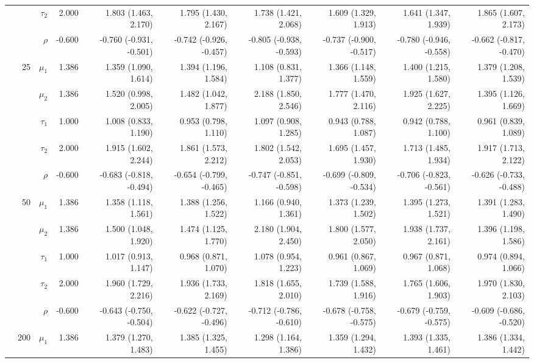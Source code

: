 \documentclass[
]{article}
\begin{document}
\begin{table}
\begin{tabular}[t]{rrrrrrrrrr}
 &  & $\tau_2$ & 2.000 & 1.803 (1.463, 2.170) & 1.795 (1.430, 2.167) & 1.738 (1.421, 2.068) & 1.609 (1.329, 1.913) & 1.641 (1.347, 1.939) & 1.865 (1.607, 2.173)\\
 &  & $\rho$ & -0.600 & -0.760 (-0.931, -0.501) & -0.742 (-0.926, -0.457) & -0.805 (-0.938, -0.593) & -0.737 (-0.900, -0.517) & -0.780 (-0.946, -0.558) & -0.662 (-0.817, -0.470)\\
\addlinespace
 & 25 & $\mu_1$ & 1.386 & 1.359 (1.090, 1.614) & 1.394 (1.196, 1.584) & 1.108 (0.831, 1.377) & 1.366 (1.148, 1.559) & 1.400 (1.215, 1.580) & 1.379 (1.208, 1.539)\\
 &  & $\mu_2$ & 1.386 & 1.520 (0.998, 2.005) & 1.482 (1.042, 1.877) & 2.188 (1.850, 2.546) & 1.777 (1.470, 2.116) & 1.925 (1.627, 2.225) & 1.395 (1.126, 1.669)\\
 &  & $\tau_1$ & 1.000 & 1.008 (0.833, 1.190) & 0.953 (0.798, 1.110) & 1.097 (0.908, 1.285) & 0.943 (0.788, 1.087) & 0.942 (0.788, 1.100) & 0.961 (0.839, 1.089)\\
 &  & $\tau_2$ & 2.000 & 1.915 (1.602, 2.244) & 1.861 (1.573, 2.212) & 1.802 (1.542, 2.053) & 1.695 (1.457, 1.930) & 1.713 (1.485, 1.934) & 1.917 (1.713, 2.122)\\
 &  & $\rho$ & -0.600 & -0.683 (-0.818, -0.494) & -0.654 (-0.799, -0.465) & -0.747 (-0.851, -0.598) & -0.699 (-0.809, -0.534) & -0.706 (-0.823, -0.561) & -0.626 (-0.733, -0.488)\\
\addlinespace
 & 50 & $\mu_1$ & 1.386 & 1.358 (1.118, 1.561) & 1.388 (1.256, 1.522) & 1.166 (0.940, 1.361) & 1.373 (1.239, 1.502) & 1.395 (1.273, 1.521) & 1.391 (1.283, 1.490)\\
 &  & $\mu_2$ & 1.386 & 1.500 (1.048, 1.920) & 1.474 (1.125, 1.770) & 2.180 (1.904, 2.450) & 1.800 (1.577, 2.050) & 1.938 (1.737, 2.161) & 1.396 (1.198, 1.586)\\
 &  & $\tau_1$ & 1.000 & 1.017 (0.913, 1.147) & 0.968 (0.871, 1.070) & 1.078 (0.954, 1.223) & 0.961 (0.867, 1.069) & 0.967 (0.871, 1.068) & 0.974 (0.894, 1.066)\\
 &  & $\tau_2$ & 2.000 & 1.960 (1.729, 2.216) & 1.936 (1.733, 2.169) & 1.818 (1.655, 2.010) & 1.739 (1.588, 1.916) & 1.765 (1.606, 1.903) & 1.970 (1.830, 2.103)\\
 &  & $\rho$ & -0.600 & -0.643 (-0.750, -0.504) & -0.622 (-0.727, -0.496) & -0.712 (-0.786, -0.610) & -0.678 (-0.758, -0.575) & -0.679 (-0.759, -0.575) & -0.609 (-0.686, -0.520)\\
\addlinespace
 & 200 & $\mu_1$ & 1.386 & 1.379 (1.270, 1.483) & 1.385 (1.325, 1.455) & 1.298 (1.164, 1.386) & 1.359 (1.294, 1.432) & 1.393 (1.335, 1.461) & 1.386 (1.334, 1.442)\\

\end{tabular}
\end{table}
\end{document}
